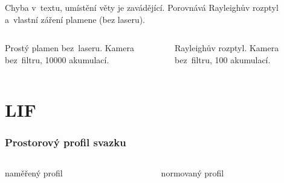 \documentclass[10pt]{beamer}
\begin{document}
\begin{frame}
	Chyba v~textu, umístění věty je zavádějící.
	Porovnává Rayleighův rozptyl a~vlastní záření plamene (bez laseru).
	\small
	\begin{columns}[t]
	\begin{column}{0.5\textwidth}
		
		\smallskip\par
		Prostý plamen bez~laseru. Kamera bez~filtru, 10000 akumulací.
	\end{column}
	\begin{column}{0.5\textwidth}
		
		\smallskip\par
		Rayleighův rozptyl. Kamera bez~filtru, 100 akumulací.
	\end{column}
	\end{columns}
\end{frame}

\appendix
\begin{frame}
	\partpage
\end{frame}

\section{LIF}
\providecommand\vol{V}
\providecommand\sensabs{D_\text{a}}
\providecommand\lifsens{D_\text{F}}
\providecommand\rayleighsens{D_\text{R}}
\providecommand\lifsignal{M_\text{F}}
\providecommand\rayleighsignal{M_\text{R}}
\providecommand\rayleighndens{\ndens_\text{R}}
\providecommand\beamprofile{s}

\begin{frame}
	\frametitle{Prostorový profil svazku}
	\begin{columns}
	\begin{column}{0.5\textwidth}
		\centering
		naměřený profil
		\resizebox{\textwidth}{!}{
			
		}
	\end{column}
	\begin{column}{0.5\textwidth}
		\centering
		normovaný profil
		\resizebox{\textwidth}{!}{
			
		}
	\end{column}
	\end{columns}
\end{frame}
\end{document}
